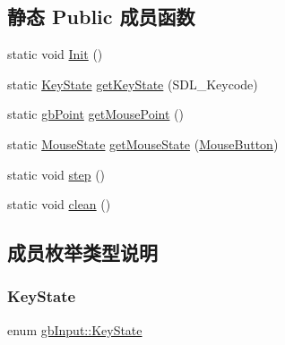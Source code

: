 \subsection*{静态 Public 成员函数}
\begin{DoxyCompactItemize}
\item 
static void \mbox{\hyperlink{classgb_input_a1c1bd55741717af5ab438340da8d6856}{Init}} ()
\item 
static \mbox{\hyperlink{classgb_input_af8c222f97119246c7b6e3c127a47a5bb}{Key\+State}} \mbox{\hyperlink{classgb_input_a6acdc1c4b53832139cf3d1cdf06061fe}{get\+Key\+State}} (S\+D\+L\+\_\+\+Keycode)
\item 
static \mbox{\hyperlink{classgb_point}{gb\+Point}} \mbox{\hyperlink{classgb_input_a4990717da115800069b6732bf1a084a8}{get\+Mouse\+Point}} ()
\item 
static \mbox{\hyperlink{classgb_input_adf80e0206ecdf62ba8c55e9d5ac9c290}{Mouse\+State}} \mbox{\hyperlink{classgb_input_accf6fe3ece1c770b30c83644ff6b473d}{get\+Mouse\+State}} (\mbox{\hyperlink{classgb_input_a8b92d031046a9cc8e432684fae3ee398}{Mouse\+Button}})
\item 
static void \mbox{\hyperlink{classgb_input_ac294faea739dc21a97cd651208bbeb29}{step}} ()
\item 
static void \mbox{\hyperlink{classgb_input_af19d729b885e2075024364310927e3b3}{clean}} ()
\end{DoxyCompactItemize}


\subsection{成员枚举类型说明}
\mbox{\label{classgb_input_af8c222f97119246c7b6e3c127a47a5bb}} 
\subsubsection{\texorpdfstring{KeyState}{KeyState}}
{\footnotesize\ttfamily enum \mbox{\hyperlink{classgb_input_af8c222f97119246c7b6e3c127a47a5bb}{gb\+Input\+::\+Key\+State}}}

